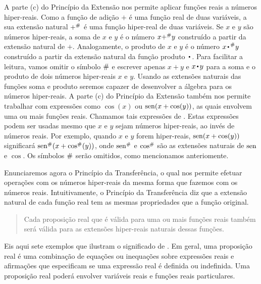 A parte (c) do Princípio da Extensão nos permite aplicar funções reais
a números hiper-reais. Como a função de adição $+$ é uma função real
de duas variáveis, a sua extensão natural ${+}^\#$ é uma função
hiper-real de duas variáveis. Se $x$ e $y$ são números hiper-reais, a
soma de $x$ e $y$ é o número $x {+}^\# y$ construído a partir da
extensão natural de $+$. Analogamente, o produto de $x$ e $y$ é o número
$x \hyper{\Cdot} y$ construído a partir da extensão natural da função
produto $\Cdot$. Para facilitar a leitura, vamos omitir o símbolo
$\#$ e escrever apenas $x + y$ e $x \Cdot y$ para a soma e o
produto de dois números hiper-reais $x$ e $y$. Usando as extensões
naturais das funções soma e produto seremos capazer de desenvolver a
álgebra para os números hiper-reais. A parte (c) do Princípio da Extensão
também nos permite trabalhar com expressões como $\cos(x)$ ou
$\operatorname{sen}(x + \cos(y))$, as quais envolvem uma ou mais funções reais.
Chamamos tais expressões de .
Estas expressões podem ser usadas mesmo que $x$ e $y$ sejam números
hiper-reais, ao invés de números reais. Por exemplo, quando $x$ e $y$ forem
hiper-reais, $\operatorname{sen}(x + \cos(y))$ significará
${\operatorname{sen}}^\#(x + {\cos}^\#(y))$, onde ${\operatorname{sen}}^\#$ e ${\cos}^\#$
são as extensões naturais de $\operatorname{sen}$ e $\cos$. Os símbolos $\#$
serão omitidos, como mencionamos anteriomente.

Enunciaremos agora o Princípio da Transferência, o qual nos permite efetuar
operações com os números hiper-reais da mesma forma que fazemos com os números
reais. Intuitivamente, o Princípio da Transferência diz que a extensão
natural de cada função real tem as mesmas propriedades que a função original.


\begin{quote}
Cada proposição real que é válida para uma ou mais funções reais
também será válida para as extensões hiper-reais naturais dessas funções.
\end{quote}

Eis aqui sete exemplos que ilustram o significado de .
Em geral, uma proposição real é uma combinação de equações ou inequações
sobre expressões reais e afirmações que especificam se uma expressão real
é definida ou indefinida. Uma proposição real poderá envolver variáveis
reais e funções reais particulares.

